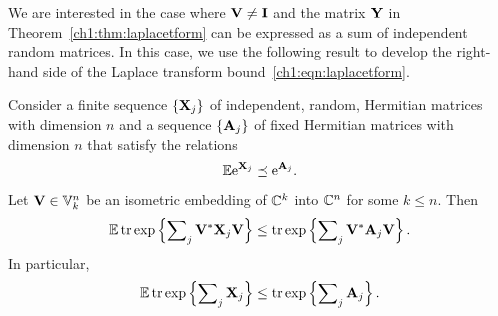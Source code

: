 We are interested in the case where $\mathbf{V} \neq \mathbf{I}$ and the matrix $\mathbf{Y}$ in 
Theorem~\ref{ch1:thm:laplacetform} can be expressed as a sum of independent random matrices.
In this case, we use the following result to develop the right-hand side of the
Laplace transform bound~\eqref{ch1:eqn:laplacetform}.


\begin{thm}
Consider a finite sequence $\{\mathbf{X}_j\}$ of independent, random, Hermitian
matrices with dimension $n$ and a sequence $\{\mathbf{A}_j\}$ of fixed Hermitian
matrices with dimension $n$ that satisfy the relations
\begin{equation}
 \mathbb{E}\mathrm{e}^{\mathbf{X}_j} \preceq \mathrm{e}^{\mathbf{A}_j}. 
 \label{ch1:eqn:logmgfdomination}
\end{equation}
Let $\mathbf{V} \in \mathbb{V}_{k}^{n}$ be an isometric embedding of $\mathbb{C}^k$ into $\mathbb{C}^n$
for some $k \leq n.$ Then
\begin{equation}
 \mathbb{E} \operatorname{tr} \mathrm{exp}\left\{\sum\nolimits_j \mathbf{V}^* \mathbf{X}_j \mathbf{V} \right\} \leq
\operatorname{tr} \mathrm{exp}\left\{\sum\nolimits_j \mathbf{V}^* \mathbf{A}_j \mathbf{V} \right\}.
 \label{ch1:eqn:pinchedmgf}
\end{equation}
In particular, 
\begin{equation}
 \mathbb{E} \operatorname{tr} \mathrm{exp}\left\{\sum\nolimits_j \mathbf{X}_j \right\} \leq \operatorname{tr}
\mathrm{exp}\left\{\sum\nolimits_j \mathbf{A}_j \right\}.
 \label{ch1:eqn:unpinchedmgf}
\end{equation}

\label{ch1:thm:mgf}
\end{thm}




